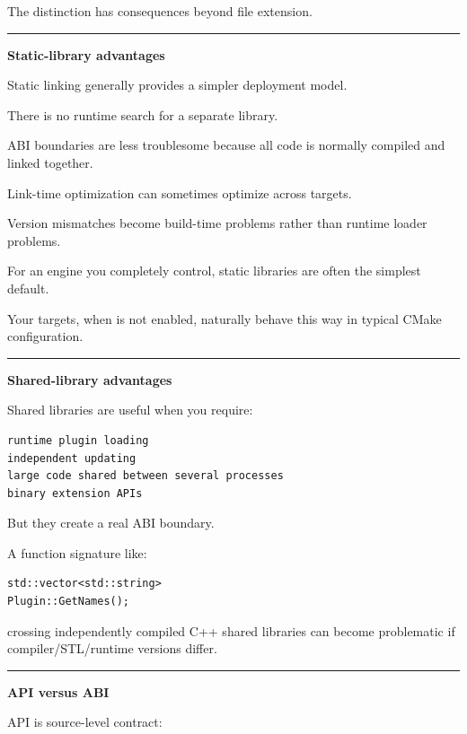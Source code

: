 The distinction has consequences beyond file extension.

\begin{center}\rule{0.5\linewidth}{0.5pt}\end{center}

\textbf{Static-library advantages}

Static linking generally provides a simpler deployment model.

There is no runtime search for a separate library.

ABI boundaries are less troublesome because all code is normally compiled and linked together.

Link-time optimization can sometimes optimize across targets.

Version mismatches become build-time problems rather than runtime loader problems.

For an engine you completely control, static libraries are often the simplest default.

Your  targets, when  is not enabled, naturally behave this way in typical CMake configuration.

\begin{center}\rule{0.5\linewidth}{0.5pt}\end{center}

\textbf{Shared-library advantages}

Shared libraries are useful when you require:

\begin{verbatim}
runtime plugin loading
independent updating
large code shared between several processes
binary extension APIs
\end{verbatim}

But they create a real ABI boundary.

A function signature like:

\begin{verbatim}
std::vector<std::string>
Plugin::GetNames();
\end{verbatim}

crossing independently compiled C++ shared libraries can become problematic if compiler/STL/runtime versions differ.

\begin{center}\rule{0.5\linewidth}{0.5pt}\end{center}

\textbf{API versus ABI}

API is source-level contract:

